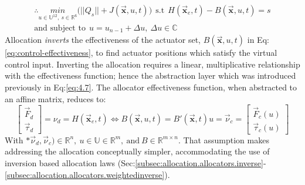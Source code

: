 \begin{multline}
\therefore\underset{u\in\mathbb{U}^{12},~s\in\mathbb{R}^6}{min}\big(||Q_s||+J(\vec{\mathbf{x}},u,t)\big)~~\text{s.t}~~H(\vec{\mathbf{x}}_e,t)-B(\vec{\mathbf{x}},u,t)=s\\\text{and subject to}~~u=u_{n-1}+\Delta u,~\Delta u\in\mathbb{C}
\end{multline}
Allocation \emph{inverts} the effectiveness of the actuator set, $B(\vec{\mathbf{x}},u,t)$ in Eq:\ref{eq:control-effectiveness}, to find actuator positions which satisfy the virtual control input. Inverting the allocation requires a linear, multiplicative relationship with the effectiveness function; hence the abstraction layer which was introduced previously in Eq:\ref{eq:4.7}. The allocator effectiveness function, when abstracted to an affine matrix, reduces to:
\begin{equation}
\begin{bmatrix}
\vec{F}_d\\
\vec{\tau}_d
\end{bmatrix}={\nu}_d=H(\vec{\mathbf{x}}_e,t)\Longleftrightarrow B(\vec{\mathbf{x}},u,t)=B'(\vec{\mathbf{x}},t)u=\vec{\nu}_c=\begin{bmatrix}
\vec{F}_c(u)\\
\vec{\tau}_c(u)
\end{bmatrix}
\end{equation}
With $*\vec{\nu}_d,\vec{\nu}_c)\in\mathbb{R}^n,~u\in\mathbb{U}\in\mathbb{R}^m,~\text{and}~B\in\mathbb{R}^{m\times n}$. That assumption makes addressing the allocation conceptually simpler, accommodating the use of inversion based allocation laws (Sec:\ref{subsec:allocation.allocators.inverse}-\ref{subsec:allocation.allocators.weightedinverse}).
